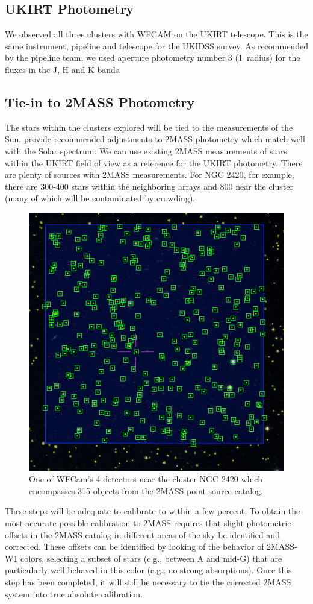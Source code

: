 \documentclass{aastex6}
\begin{document}
\subsection{UKIRT Photometry}

We observed all three clusters with WFCAM on the UKIRT telescope.
This is the same instrument, pipeline and telescope for the UKIDSS survey.
As recommended by the pipeline team, we used aperture photometry number 3 (1\arcsec\ radius) for the fluxes in the J, H and K bands.

\subsection{Tie-in to 2MASS Photometry}

The stars within the clusters explored will be tied to the measurements of the Sun.
\citet{rieke2008absIRcal} provide recommended adjustments to 2MASS photometry which match well with the Solar spectrum.
We can use existing 2MASS measurements of stars within the UKIRT field of view as a reference for the UKIRT photometry.
There are plenty of sources with 2MASS measurements.
For NGC 2420, for example, there are 300-400 stars within the neighboring arrays and 800 near the cluster (many of which will be contaminated by crowding).

\begin{figure}[!hbtp]
\centering
\includegraphics[width=.4\columnwidth]{aladin_ngc2420_wfcam_square.png}
\caption{One of WFCam's 4 detectors near the cluster NGC 2420 which encompasses 315 objects from the 2MASS point source catalog.}\label{fig:wfcam3}
\end{figure}

These steps will be adequate to calibrate to within a few percent.
To obtain the most accurate possible calibration to 2MASS requires that slight photometric offsets in the 2MASS catalog in different areas of the sky be identified and corrected.
These offsets can be identified by looking of the behavior of 2MASS-W1 colors, selecting a subset of stars (e.g., between A and mid-G) that are particularly well behaved in this color (e.g., no strong absorptions).
Once this step has been completed, it will still be necessary to tie the corrected 2MASS system into true absolute calibration. 
\end{document}
